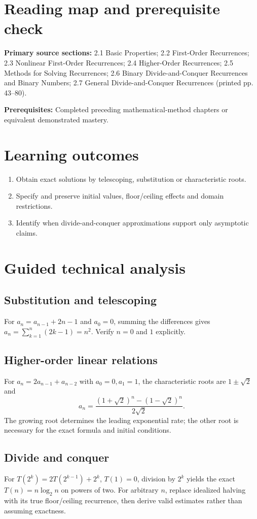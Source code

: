 \documentclass[11pt]{article}
\begin{document}
\makedoctocpage
\section{Reading map and prerequisite check}
\noindent\textbf{Primary source sections:} 2.1 Basic Properties; 2.2 First-Order Recurrences; 2.3 Nonlinear First-Order Recurrences; 2.4 Higher-Order Recurrences; 2.5 Methods for Solving Recurrences; 2.6 Binary Divide-and-Conquer Recurrences and Binary Numbers; 2.7 General Divide-and-Conquer Recurrences (printed pp. 43--80).\par
\noindent\textbf{Prerequisites:} Completed preceding mathematical-method chapters or equivalent demonstrated mastery.\par
\section{Learning outcomes}
\begin{enumerate}
\item Obtain exact solutions by telescoping, substitution or characteristic roots.
\item Specify and preserve initial values, floor/ceiling effects and domain restrictions.
\item Identify when divide-and-conquer approximations support only asymptotic claims.
\end{enumerate}
\section{Guided technical analysis}
\subsection{Substitution and telescoping}
For $a_n=a_{n-1}+2n-1$ and $a_0=0$, summing the differences gives $a_n=\sum_{k=1}^n(2k-1)=n^2$. Verify $n=0$ and $1$ explicitly.
\subsection{Higher-order linear relations}
For $a_n=2a_{n-1}+a_{n-2}$ with $a_0=0,a_1=1$, the characteristic roots are $1\pm\sqrt2$ and
\[
a_n=\frac{(1+\sqrt2)^n-(1-\sqrt2)^n}{2\sqrt2}.
\]
The growing root determines the leading exponential rate; the other root is necessary for the exact formula and initial conditions.
\subsection{Divide and conquer}
For $T(2^k)=2T(2^{k-1})+2^k$, $T(1)=0$, division by $2^k$ yields the exact $T(n)=n\log_2 n$ on powers of two. For arbitrary $n$, replace idealized halving with its true floor/ceiling recurrence, then derive valid estimates rather than assuming exactness.
\end{document}

